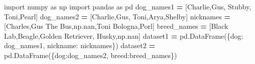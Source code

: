 \documentclass[
  12pt,
  krantz2]{krantz}
\makeatletter
\newenvironment{Shaded}{\begin{snugshade}}{\end{snugshade}}
\newcommand{\ImportTok}[1]{#1}
\newcommand{\NormalTok}[1]{#1}
\newcommand{\OperatorTok}[1]{\textcolor[rgb]{0.43,0.43,0.43}{\textbf{#1}}}
\newcommand{\StringTok}[1]{\textcolor[rgb]{0.5,0.5,0.5}{#1}}
\newenvironment{kframe}{%
\medskip{}
\setlength{\fboxsep}{.8em}
 \def\at@end@of@kframe{}%
 \ifinner\ifhmode%
  \def\at@end@of@kframe{\end{minipage}}%
  \begin{minipage}{\columnwidth}%
 \fi\fi%
 \def\FrameCommand##1{\hskip\@totalleftmargin \hskip-\fboxsep
 \colorbox{shadecolor}{##1}\hskip-\fboxsep
     \hskip-\linewidth \hskip-\@totalleftmargin \hskip\columnwidth}%
 \MakeFramed {\advance\hsize-\width
   \@totalleftmargin\z@ \linewidth\hsize
   \@setminipage}}%
 {\par\unskip\endMakeFramed%
 \at@end@of@kframe}
\renewenvironment{Shaded}{\begin{kframe}}{\end{kframe}}
\makeatother
\begin{document}
\begin{Shaded}
\begin{Highlighting}[]
\ImportTok{import}\NormalTok{ numpy }\ImportTok{as}\NormalTok{ np}
\ImportTok{import}\NormalTok{ pandas }\ImportTok{as}\NormalTok{ pd}
\NormalTok{dog\_names1 }\OperatorTok{=}\NormalTok{ [}\StringTok{\textquotesingle{}Charlie\textquotesingle{}}\NormalTok{,}\StringTok{\textquotesingle{}Gus\textquotesingle{}}\NormalTok{, }\StringTok{\textquotesingle{}Stubby\textquotesingle{}}\NormalTok{, }\StringTok{\textquotesingle{}Toni\textquotesingle{}}\NormalTok{,}\StringTok{\textquotesingle{}Pearl\textquotesingle{}}\NormalTok{]}
\NormalTok{dog\_names2 }\OperatorTok{=}\NormalTok{ [}\StringTok{\textquotesingle{}Charlie\textquotesingle{}}\NormalTok{,}\StringTok{\textquotesingle{}Gus\textquotesingle{}}\NormalTok{, }\StringTok{\textquotesingle{}Toni\textquotesingle{}}\NormalTok{,}\StringTok{\textquotesingle{}Arya\textquotesingle{}}\NormalTok{,}\StringTok{\textquotesingle{}Shelby\textquotesingle{}}\NormalTok{]}
\NormalTok{nicknames }\OperatorTok{=}\NormalTok{ [}\StringTok{\textquotesingle{}Charles\textquotesingle{}}\NormalTok{,}\StringTok{\textquotesingle{}Gus The Bus\textquotesingle{}}\NormalTok{,np.nan,}\StringTok{\textquotesingle{}Toni Bologna\textquotesingle{}}\NormalTok{,}\StringTok{\textquotesingle{}Porl\textquotesingle{}}\NormalTok{]}
\NormalTok{breed\_names }\OperatorTok{=}\NormalTok{ [}\StringTok{\textquotesingle{}Black Lab\textquotesingle{}}\NormalTok{,}\StringTok{\textquotesingle{}Beagle\textquotesingle{}}\NormalTok{,}\StringTok{\textquotesingle{}Golden Retriever\textquotesingle{}}\NormalTok{, }\StringTok{\textquotesingle{}Husky\textquotesingle{}}\NormalTok{,np.nan]}
\NormalTok{dataset1 }\OperatorTok{=}\NormalTok{ pd.DataFrame(\{}\StringTok{\textquotesingle{}dog\textquotesingle{}}\NormalTok{: dog\_names1,}
                        \StringTok{\textquotesingle{}nickname\textquotesingle{}}\NormalTok{: nicknames\})}
\NormalTok{dataset2 }\OperatorTok{=}\NormalTok{ pd.DataFrame(\{}\StringTok{\textquotesingle{}dog\textquotesingle{}}\NormalTok{:dog\_names2,}
                        \StringTok{\textquotesingle{}breed\textquotesingle{}}\NormalTok{:breed\_names\})}
\end{Highlighting}
\end{Shaded}
\end{document}

